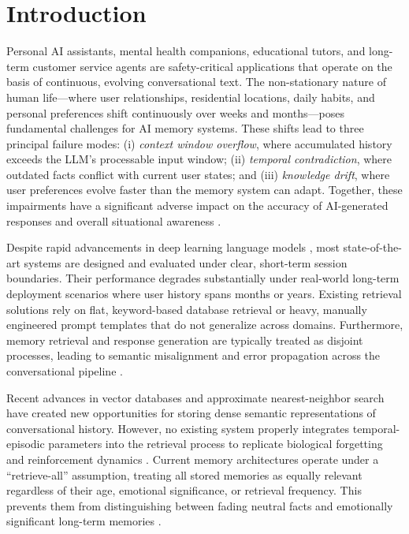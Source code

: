 \documentclass[conference]{IEEEtran}
\begin{document}
\section{Introduction}

Personal AI assistants, mental health companions, educational tutors, and long-term customer service agents are safety-critical applications that operate on the basis of continuous, evolving conversational text. The non-stationary nature of human life—where user relationships, residential locations, daily habits, and personal preferences shift continuously over weeks and months—poses fundamental challenges for AI memory systems. These shifts lead to three principal failure modes: (i) \textit{context window overflow}, where accumulated history exceeds the LLM's processable input window; (ii) \textit{temporal contradiction}, where outdated facts conflict with current user states; and (iii) \textit{knowledge drift}, where user preferences evolve faster than the memory system can adapt. Together, these impairments have a significant adverse impact on the accuracy of AI-generated responses and overall situational awareness \cite{shi}.

Despite rapid advancements in deep learning language models \cite{vaswani}, most state-of-the-art systems are designed and evaluated under clear, short-term session boundaries. Their performance degrades substantially under real-world long-term deployment scenarios where user history spans months or years. Existing retrieval solutions rely on flat, keyword-based database retrieval or heavy, manually engineered prompt templates that do not generalize across domains. Furthermore, memory retrieval and response generation are typically treated as disjoint processes, leading to semantic misalignment and error propagation across the conversational pipeline \cite{liu}.

Recent advances in vector databases and approximate nearest-neighbor search \cite{johnson} have created new opportunities for storing dense semantic representations of conversational history. However, no existing system properly integrates temporal-episodic parameters into the retrieval process to replicate biological forgetting and reinforcement dynamics \cite{xu}. Current memory architectures operate under a ``retrieve-all'' assumption, treating all stored memories as equally relevant regardless of their age, emotional significance, or retrieval frequency. This prevents them from distinguishing between fading neutral facts and emotionally significant long-term memories \cite{sun}.
\end{document}
